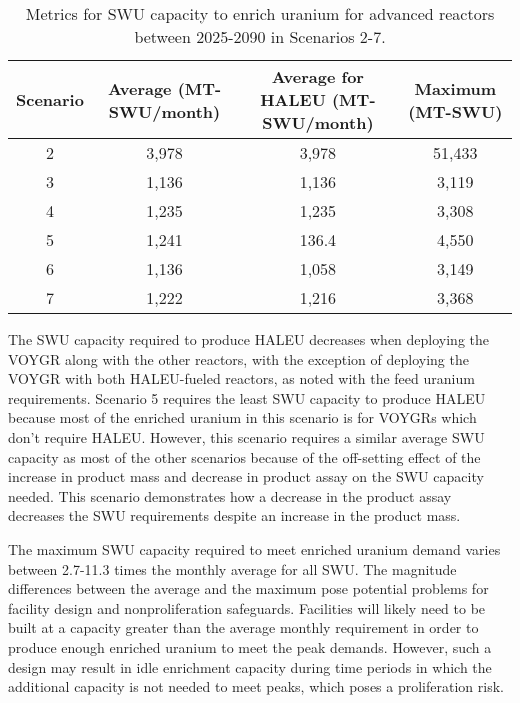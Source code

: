 \begin{table}
    \centering 
    \caption{Metrics for \gls{SWU} capacity to enrich uranium for 
    advanced reactors between 2025-2090 in Scenarios 2-7.}
    \label{tab:nogrowth_swu}
    \begin{tabular}{c c c c}
        \hline
        Scenario & Average  (MT-SWU/month) & Average
        for \gls{HALEU} (MT-SWU/month) & Maximum (MT-SWU)\\\hline
        2 & 3,978 & 3,978 & 51,433 \\
        3 & 1,136 & 1,136 & 3,119\\
        4 & 1,235 & 1,235 & 3,308\\
        5 & 1,241 & 136.4 & 4,550 \\
        6 & 1,136 & 1,058 & 3,149\\
        7 & 1,222 & 1,216 & 3,368\\
        \hline
    \end{tabular}
\end{table}

The \gls{SWU} capacity required to produce \gls{HALEU} decreases when 
deploying the VOYGR along with the other reactors, with the exception 
of deploying the VOYGR with both \gls{HALEU}-fueled reactors, as noted 
with the feed uranium requirements. 
Scenario 5 requires the least \gls{SWU} capacity to produce 
\gls{HALEU} because most of the enriched uranium in this 
scenario is for VOYGRs which don't require \gls{HALEU}. However, this 
scenario requires a similar average \gls{SWU} capacity as most of the other 
scenarios because of the off-setting effect of the increase in product mass 
and decrease in product assay on the \gls{SWU} capacity needed. This 
scenario demonstrates how a decrease in the product assay decreases 
the \gls{SWU} requirements despite an increase in the product mass. 

The maximum \gls{SWU} capacity required to meet enriched uranium demand 
varies between 2.7-11.3 times the monthly average for all \gls{SWU}. 
The magnitude differences between the average and the maximum pose potential 
problems for facility design and nonproliferation safeguards. Facilities 
will likely need to be built at a capacity greater than the average 
monthly requirement in order to produce enough enriched uranium to meet 
the peak demands. However, such a design may result in idle enrichment 
capacity during time periods in which the additional capacity is 
not needed to meet peaks, which poses a proliferation risk. 

